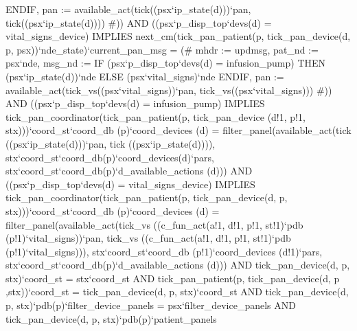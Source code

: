                  ENDIF,
            pan
              := available_act(tick((psx`ip_state(d)))`pan,
                               tick((psx`ip_state(d)))) #)) AND
((psx`p_disp_top`devs(d) = vital_signs_device)
        IMPLIES
        next_cm(tick_pan_patient(p,
                  tick_pan_device(d, p, psx))`nde_state)`current_pan_msg
         =
         (# mhdr := updmsg,
            pat_nd := psx`nde,
            msg_nd
              := IF (psx`p_disp_top`devs(d) = infusion_pump)
                   THEN (psx`ip_state(d))`nde
                 ELSE (psx`vital_signs)`nde
                 ENDIF,
            pan
              := available_act(tick_vs((psx`vital_signs))`pan,
                               tick_vs((psx`vital_signs))) #)) AND
 ((psx`p_disp_top`devs(d) = infusion_pump)
        IMPLIES
        tick_pan_coordinator(tick_pan_patient(p, tick_pan_device
                                              (d!1,
                                               p!1,
                                               stx)))`coord_st`coord_db
            (p)`coord_devices
            (d)
         =
         filter_panel(available_act(tick
                                    ((psx`ip_state(d)))`pan,
                                    tick
                                    ((psx`ip_state(d)))),
                      stx`coord_st`coord_db(p)`coord_devices(d)`pars,
                      stx`coord_st`coord_db(p)`d_available_actions
                          (d))) AND
((psx`p_disp_top`devs(d) = vital_signs_device)
        IMPLIES
        tick_pan_coordinator(tick_pan_patient(p,
                   tick_pan_device(d, p, stx)))`coord_st`coord_db
            (p)`coord_devices
            (d)
         =
         filter_panel(available_act(tick_vs
                                    ((c_fun_act(a!1, d!1, p!1, st!1)`pdb
                                      (p!1)`vital_signs))`pan,
                                    tick_vs
                                    ((c_fun_act(a!1, d!1, p!1, st!1)`pdb
                                      (p!1)`vital_signs))),
                     stx`coord_st`coord_db
                          (p!1)`coord_devices
                          (d!1)`pars,
                      stx`coord_st`coord_db(p)`d_available_actions
                          (d))) AND
tick_pan_device(d, p, stx)`coord_st = stx`coord_st AND
tick_pan_patient(p, tick_pan_device(d, p ,stx))`coord_st
       = tick_pan_device(d, p, stx)`coord_st AND
tick_pan_device(d, p, stx)`pdb(p)`filter_device_panels
       = psx`filter_device_panels AND
tick_pan_device(d, p, stx)`pdb(p)`patient_panels

